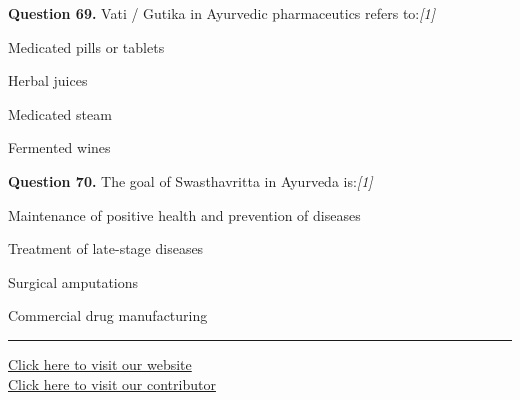 \documentclass[11pt,a4paper]{article}
\newcommand{\pts}[1]{\hfill   \textit{[#1]}}
\begin{document}
\medskip




\noindent   \textbf{Question 69.} Vati / Gutika in Ayurvedic pharmaceutics refers to:\pts{1}

\begin{parts}
  \item Medicated pills or tablets
  \item Herbal juices
  \item Medicated steam
  \item Fermented wines
\end{parts}

\medskip




\noindent   \textbf{Question 70.} The goal of Swasthavritta in Ayurveda is:\pts{1}

\begin{parts}
  \item Maintenance of positive health and prevention of diseases
  \item Treatment of late-stage diseases
  \item Surgical amputations
  \item Commercial drug manufacturing
\end{parts}

\vfill
\rule{\linewidth}{0.4pt}

\begin{center}\small
\href{https://bhu-exam.vercel.app/}{Click here to visit our website}\\[4pt]
\href{https://me-aryan.vercel.app/}{Click here to visit our contributor}
\end{center}
\end{document}
